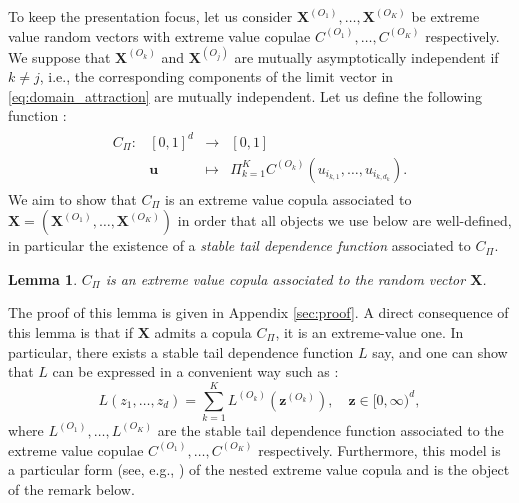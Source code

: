 \documentclass[11pt]{article}
\newtheorem{lemma}{Lemma}
\theoremstyle{definition}
\begin{document}
	To keep the presentation focus, let us consider $\textbf{X}^{(O_1)}, \dots, \textbf{X}^{(O_K)}$ be extreme value random vectors with extreme value copulae $C^{(O_1)}, \dots, C^{(O_K)}$ respectively. We suppose that $\textbf{X}^{(O_k)}$ and $\textbf{X}^{(O_j)}$ are mutually asymptotically independent if $k \neq j$, i.e., the corresponding components of the limit vector in \eqref{eq:domain_attraction} are mutually independent. Let us define the following function :
	\begin{align*}
		\begin{array}{lrcl}
C_\Pi : & [0,1]^d & \longrightarrow & [0,1] \\
    & \textbf{u} & \longmapsto & \Pi_{k=1}^K C^{(O_k)}(u_{i_{k,1}}, \dots, u_{i_{k,d_k}}). \end{array}
	\end{align*}
	We aim to show that $C_\Pi$ is an extreme value copula associated to $\textbf{X} = (\textbf{X}^{(O_1)}, \dots, \textbf{X}^{(O_K)})$ in order that all objects we use below are well-defined, in particular the existence of a \emph{stable tail dependence function} associated to $C_\Pi$.
	\begin{lemma}
		\label{lem:Cevt}
		$C_\Pi$ is an extreme value copula associated to the random vector $\textbf{X}$.
	\end{lemma}
	The proof of this lemma is given in Appendix \ref{sec:proof}. A direct consequence of this lemma is that if $\textbf{X}$ admits a copula $C_\Pi$, it is an extreme-value one. In particular, there exists a stable tail dependence function $L$ say, and one can show that $L$ can be expressed in a convenient way such as :
	\begin{equation}
		\label{eq:mutual_indep_stdf}
		L\left(z_1, \dots, z_d\right) = \sum_{k=1}^K L^{(O_k)}\left( \textbf{z}^{(O_k)} \right), \quad \textbf{z} \in [0,\infty)^d,
	\end{equation}
	where $L^{(O_1)}, \dots, L^{(O_K)}$ are the stable tail dependence function associated to the extreme value copulae $C^{(O_1)}, \dots, C^{(O_K)}$ respectively. Furthermore, this model is a particular form (see, e.g., \cite{hofert2018hierarchical}) of the nested extreme value copula and is the object of the remark below.
	
\end{document}
